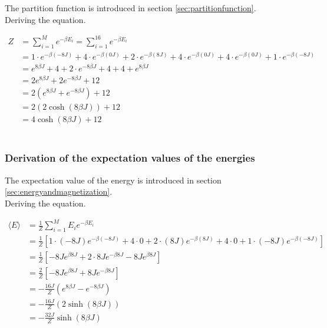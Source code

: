 \documentclass{article}
\begin{document}
The partition function is introduced in section \ref{sec:partitionfunction}. \\

Deriving the equation.

\begin{align*}
  Z &= \sum_{i=1} ^{M} e^{- \beta E_i} = \sum_{i=1} ^{16} e^{- \beta E_i} \\
  &= 1 \cdot e^{- \beta (-8J)} + 4 \cdot e^{- \beta (0J)} + 2 \cdot e^{- \beta (8J)} + 4 \cdot e^{- \beta (0J)}
  + 4 \cdot e^{- \beta (0J)} + 1 \cdot e^{- \beta (-8J)} \\
  &= e^{8 \beta J} + 4 + 2 \cdot e^{-8 \beta J} + 4 + 4 + e^{8 \beta J} \\
  &= 2 e^{8 \beta J } + 2 e^{-8 \beta J} + 12 \\
  &= 2 \left( e^{8 \beta J} + e^{- 8 \beta J} \right) + 12 \\
  &= 2 \left( 2 \cosh(8 \beta J) \right) + 12 \\
  &= 4 \cosh(8 \beta J) + 12
\end{align*} \\


\subsubsection{Derivation of the expectation values of the energies} \label{sec:derivationenergies}

The expectation value of the energy is introduced in section \ref{sec:energyandmagnetization}. \\

Deriving the equation.

\begin{align*}
  \langle E \rangle &= \frac{1}{Z} \sum _{i=1} ^M E_i e^{- \beta E_i} \\
  &= \frac{1}{Z} \left[ 1 \cdot (-8J) e^{- \beta (-8J)} + 4 \cdot 0 + 2 \cdot (8J) e^{- \beta (8J)} + 4 \cdot 0 + 1 \cdot (-8J) e^{- \beta (-8J)} \right] \\
  &= \frac{1}{Z} \left[ - 8J e^{\beta 8J} + 2 \cdot 8J e^{- \beta 8J} - 8J e^{ \beta 8J} \right] \\
  &= \frac{2}{Z} \left[ - 8J e^{\beta 8 J} + 8 J e^{- \beta 8 J} \right] \\
  &= - \frac{16 J}{Z} \left( e^{8 \beta J} - e^{- 8 \beta J} \right) \\
  &= - \frac{16 J}{Z} (2 \sinh(8 \beta J) ) \\
  &= - \frac{32 J}{Z} \sinh(8 \beta J)
\end{align*} \\
\end{document}

